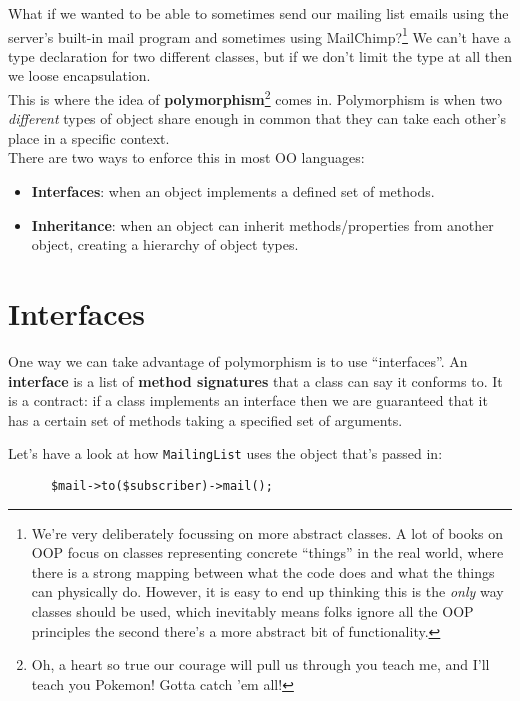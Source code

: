 What if we wanted to be able to sometimes send our mailing list emails using the server's built-in mail program and sometimes using MailChimp?\footnote{We're very deliberately focussing on more abstract classes. A lot of books on OOP focus on classes representing concrete ``things'' in the real world, where there is a strong mapping between what the code does and what the things can physically do. However, it is easy to end up thinking this is the \textit{only} way classes should be used, which inevitably means folks ignore all the OOP principles the second there's a more abstract bit of functionality.} We can't have a type declaration for two different classes, but if we don't limit the type at all then we loose encapsulation.
\\

This is where the idea of \textbf{polymorphism}\footnote{Oh, a heart so true our courage will pull us through you teach me, and I'll teach you Pokemon! Gotta catch 'em all!} comes in. Polymorphism is when two \textit{different} types of object share enough in common that they can take each other's place in a specific context.
\\

There are two ways to enforce this in most OO languages:

\begin{itemize}
    \item \textbf{Interfaces}: when an object implements a defined set of methods.
    \item \textbf{Inheritance}: when an object can inherit methods/properties from another object, creating a hierarchy of object types.
\end{itemize}


\section{Interfaces}

One way we can take advantage of polymorphism is to use ``interfaces''. An \textbf{interface} is a list of \textbf{method signatures} that a class can say it conforms to. It is a contract: if a class implements an interface then we are guaranteed that it has a certain set of methods taking a specified set of arguments.

\pagebreak

Let's have a look at how \texttt{MailingList} uses the object that's passed in:

\begin{verbatim}
      $mail->to($subscriber)->mail();
\end{verbatim}

